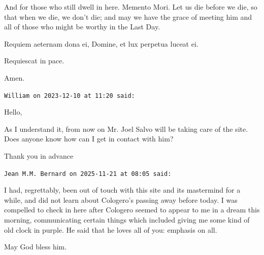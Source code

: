 \begin{footnotesize}
\begin{sffamily}
And for those who still dwell in here. Memento Mori. Let us die before we die, so that when we die, we don't die; and may we have the grace of meeting him and all of those who might be worthy in the Last Day.

Requiem aeternam dona ei, Domine, et lux perpetua luceat ei.

Requiescat in pace.

Amen.

\hfill

\texttt{William on 2023-12-10 at 11:20 said:}

Hello,

As I understand it, from now on Mr. Joel Salvo will be taking care of the site. Does anyone know how can I get in contact with him?

Thank you in advance

\hfill

\texttt{Jean M.M. Bernard on 2025-11-21 at 08:05 said:}

I had, regrettably, been out of touch with this site and its mastermind for a while, and did not learn about Cologero's passing away before today. I was compelled to check in here after Cologero seemed to appear to me in a dream this morning, communicating certain things which included giving me some kind of old clock in purple. He said that he loves all of you: emphasis on all.

May God bless him.

\end{sffamily}
\end{footnotesize}

